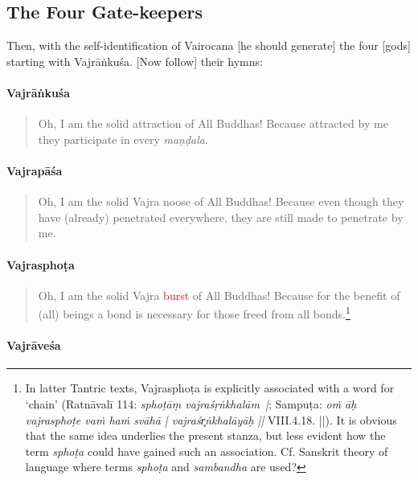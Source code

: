\documentclass[11pt]{book}
\newcommand{\red}[1]{\textcolor{red}{#1}}
\newcommand{\skt}[1]{\emph{#1}}
\begin{document}
\subsection{The Four Gate-keepers}

Then, with the self-identification of Vairocana [he should generate] the four [gods] starting with Vajrāṅkuśa. [Now follow] their hymns:

\paragraph{Vajrāṅkuśa}

\begin{verse}
Oh, I am the solid attraction of All Buddhas! Because attracted by me they participate in every \skt{maṇḍala}.\\
\end{verse}

\paragraph{Vajrapāśa}

\begin{verse}
Oh, I am the solid Vajra noose of All Buddhas! Because even though they have (already) penetrated everywhere, they are still made to penetrate by me.\\
\end{verse}

\paragraph{Vajrasphoṭa}

\begin{verse}
Oh, I am the solid Vajra \red{burst} of All Buddhas! Because for the benefit of (all) beings a bond is necessary for those freed from all bonds.\footnote{In latter Tantric texts, Vajrasphoṭa is explicitly associated with a word for `chain' (Ratnāvalī 114: \skt{sphoṭāṃ vajraśṛṅkhalām~|}; Sampuṭa: \skt{oṁ āḥ vajrasphoṭe vaṁ haṁ svāhā | vajraśr̥ṅkhalāyāḥ ||} VIII.4.18. ||). It is obvious that the same idea underlies the present stanza, but less evident how the term \skt{sphoṭa} could have gained such an association. Cf. Sanskrit theory of language where terms \skt{sphoṭa} and \skt{sambandha} are used?}
\end{verse}

\paragraph{Vajrāveśa}
\end{document}
